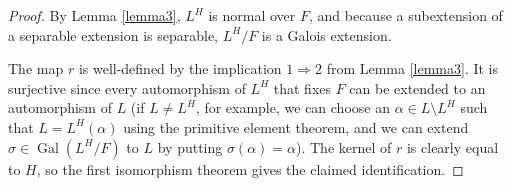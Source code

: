 \documentclass[12pt]{article}
\DeclareMathOperator{\Gal}{Gal}
\begin{document}
\begin{proof}
By Lemma \ref{lemma3}, $L^H$ is normal over $F$, and because a
subextension of a separable extension is separable, $L^H/F$ is a
Galois extension.

The map $r$ is well-defined by the implication $1\Rightarrow2$ from
Lemma \ref{lemma3}.  It is surjective since every automorphism of
$L^H$ that fixes $F$ can be extended to an automorphism of $L$ (if
$L\ne L^H$, for example, we can choose an $\alpha\in L\setminus L^H$
such that $L=L^H(\alpha)$ using the primitive element theorem, and we
can extend $\sigma\in\Gal(L^H/F)$ to $L$ by putting
$\sigma(\alpha)=\alpha$).  The kernel of $r$ is clearly equal to $H$,
so the first isomorphism theorem gives the claimed identification.
\end{proof}

\end{document}
